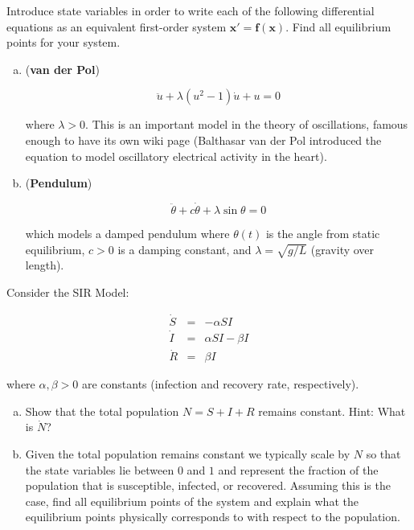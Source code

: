 \documentclass[11pt,letterpaper,boxed]{pset}
\begin{document}
    \begin{problem} [Exercise 4.]
        Introduce state variables in order to write each of the following differential equations as an equivalent  first-order system $\mathbf{x}' = \mathbf{f}(\mathbf{x})$. Find all equilibrium points for your system. 
    
        \begin{enumerate} [(a)]
            \item (\textbf{van der Pol}) 
            
                \[\ddot{u} + \lambda  (u^2 - 1) \dot{u} + u = 0\] 
            
            where $\lambda > 0$. This is an important model in the theory of oscillations, famous enough to have its own wiki page (Balthasar van der Pol introduced the equation to model oscillatory electrical activity in the heart).
            \item (\textbf{Pendulum}) 
                
                \[  \ddot{\theta} + c \dot{\theta} + \lambda \sin \theta = 0 \]
                
            which models a damped pendulum where $\theta(t)$ is the angle from static equilibrium, $c > 0$ is a damping constant, and $\lambda = \sqrt{g/L}$ (gravity over length).
        \end{enumerate}
    \end{problem}
    \newpage
    
    
    \begin{problem} [Exercise 5.]
        Consider the SIR Model:
        
        \begin{eqnarray*}
            \dot{S} & = & -\alpha S I \\
            \dot{I} & = &  \alpha S I  - \beta I  \\
            \dot{R} & = & \beta I
        \end{eqnarray*}
        
        where $\alpha,\beta  > 0$ are constants (infection and recovery rate, respectively).   
        
        \begin{enumerate} [(a)]
            \item Show that the total population $N = S+I+R$ remains constant. Hint: What is $\dot{N}$?
            \item Given the total population remains constant we typically scale by $N$ so that the state variables lie between $0$ and $1$ and represent the fraction of the population that is susceptible, infected, or recovered. Assuming this is the case, find all equilibrium points of the system and explain what the equilibrium points physically corresponds to with respect to the population.
        \end{enumerate} 
    \end{problem}
    \newpage
    
\end{document}
